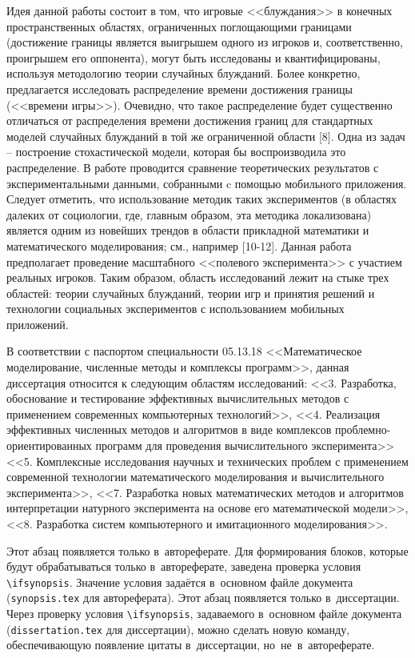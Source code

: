 Идея данной работы состоит в том, что игровые <<блуждания>> в конечных пространственных областях, ограниченных поглощающими границами 
(достижение границы является выигрышем одного из игроков и, соответственно, проигрышем его оппонента), 
могут быть исследованы и квантифицированы, используя методологию теории случайных блужданий. Более конкретно, 
предлагается исследовать распределение времени достижения границы (<<времени игры>>). Очевидно, что такое распределение 
будет существенно отличаться от распределения времени достижения границ для стандартных моделей случайных блужданий 
в той же ограниченной области [8]. Одна из задач -- построение стохастической модели, которая бы воспроизводила это распределение. 
В работе проводится сравнение теоретических результатов с экспериментальными данными, собранными c помощью мобильного приложения. 
Следует отметить, что использование методик таких экспериментов (в областях далеких от социологии, где, главным образом, эта методика локализована) 
является одним из новейших трендов в области прикладной математики и математического моделирования; см., например [10-12].
Данная работа предполагает проведение масштабного <<полевого эксперимента>> с участием реальных игроков. 
Таким образом, область исследований лежит на стыке трех областей: теории случайных блужданий, теории игр и принятия решений 
и технологии социальных экспериментов с использованием мобильных приложений. 

В соответствии с паспортом специальности 05.13.18 <<Математическое моделирование,
численные методы и комплексы программ>>, данная диссертация
относится к следующим областям исследований: <<3. Разработка, обоснование
и тестирование эффективных вычислительных методов с применением современных
компьютерных технологий>>, <<4. Реализация эффективных численных методов и алгоритмов в виде
комплексов проблемно-ориентированных программ для проведения
вычислительного эксперимента>> <<5. Комплексные исследования научных и
технических проблем с применением современной технологии математического
моделирования и вычислительного эксперимента>>, <<7. Разработка новых математических
методов и алгоритмов интерпретации натурного эксперимента на
основе его математической модели>>, <<8. Разработка систем компьютерного и имитационного моделирования>>.

\ifsynopsis
Этот абзац появляется только в~автореферате.
Для формирования блоков, которые будут обрабатываться только в~автореферате,
заведена проверка условия \verb!\!\verb!ifsynopsis!.
Значение условия задаётся в~основном файле документа (\verb!synopsis.tex! для
автореферата).
\else
Этот абзац появляется только в~диссертации.
Через проверку условия \verb!\!\verb!ifsynopsis!, задаваемого в~основном файле
документа (\verb!dissertation.tex! для диссертации), можно сделать новую
команду, обеспечивающую появление цитаты в~диссертации, но~не~в~автореферате.
\fi


